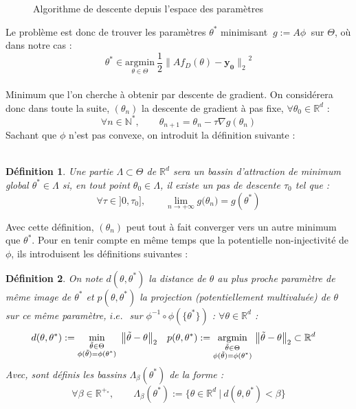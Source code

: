 \documentclass[hidelinks, french]{article} %
\newcommand{\N}{\mathbb{N}}
\newcommand{\R}{\mathbb{R}}
\newcommand{\lr}{\longrightarrow}
\newcommand{\ie}{\textit{i.e. }}
\newcommand{\argmin}[1]{\underset{#1}{\text{argmin}}}
\renewcommand{\bf}[1]{\boldsymbol{#1}}
\theoremstyle{enonce}
\newtheorem{definition}{Définition}
\theoremstyle{special}
\theoremstyle{rq}
\theoremstyle{exo}
\theoremstyle{demo}
\begin{document}
\begin{wrapfigure}{r}{0.43\textwidth}
	
	\caption{Algorithme de descente depuis l'espace des paramètres}
	\label{fig:pcode LGD}
\end{wrapfigure}

Le problème est donc de trouver les paramètres $\theta^*$ minimisant $\ g:=A\phi\ $ sur $\Theta$, où dans notre cas :
\[\theta^*\in\argmin{\theta\in\Theta}\ \frac{1}{2}{\big\|Af_D(\theta)-\bf{y_0}\big\|_2}^2\]
\\
Minimum que l'on cherche à obtenir par descente de gradient. On considérera donc dans toute la suite, $(\theta_n)$ la descente de gradient à pas fixe, $\forall\theta_0\in\R^d$ :
\[\forall n\in\N^*,\qquad \theta_{n+1} = \theta_n - \tau\nabla g(\theta_n)\]
Sachant que $\phi$ n'est pas convexe, on introduit la définition suivante :
\\ \\
\begin{definition}
	Une partie $\Lambda\subset\Theta$ de $\R^d$ sera un \emph{bassin d'attraction} de minimum global $\theta^*\in\Lambda$ si, en tout point $\theta_0\in\Lambda$, il existe un pas de descente $\tau_0$ tel que :
	\[\forall \tau\in]0,\tau_0],\qquad \lim_{n\lr+\infty}g\big(\theta_n\big)=g(\theta^*)\]
\end{definition}

Avec cette définition, $(\theta_n)$ peut tout à fait converger vers un autre minimum que $\theta^*$. Pour en tenir compte en même temps que la potentielle non-injectivité de $\phi$, ils introduisent les définitions suivantes :
\\
\begin{definition}\label{def:boule}
	On note $d(\theta,\theta^*)$ la distance de $\theta$ au plus proche paramètre de même image de $\theta^*$ et $p(\theta,\theta^*)$ la projection (potentiellement multivaluée) de $\theta$ sur ce même paramètre, $\ie$ sur $\phi^{-1}\circ\phi(\{\theta^*\})$ :
	$\forall\theta\in\R^d$ :
	\begin{align*}d(\theta,\theta^*) &:=\min_{\substack{\Tilde{\theta}\in\Theta\\ \phi(\Tilde{\theta})=\phi(\theta^*)}}\ \big\|\Tilde{\theta}-\theta\big\|_2  &  p(\theta,\theta^*)&:=\argmin{\substack{\Tilde{\theta}\in\Theta\\ \phi(\Tilde{\theta})=\phi(\theta^*)}}\ \big\|\Tilde{\theta}-\theta\big\|_2\subset\R^d\end{align*}
	Avec, sont définis les bassins $\Lambda_\beta(\theta^*)$ de la forme :
	\[\forall \beta\in\R^{+_*},\qquad \Lambda_\beta(\theta^*):=\big\{\theta\in\R^d\ |\ d(\theta, \theta^*)<\beta\big\}\]
\end{definition}
\end{document}
